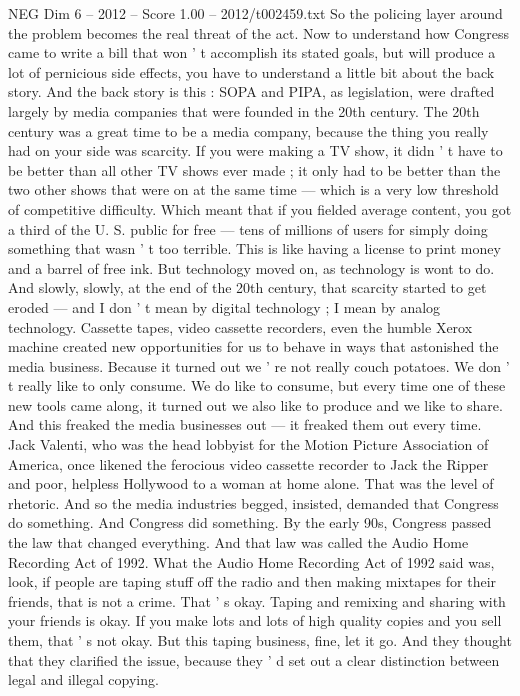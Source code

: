 \begin{textsample}{NEG Dim 6 – 2012 – Score 1.00 – 2012/t002459.txt}
So the policing layer around the problem becomes the real threat of the act.
Now to understand how Congress came to write a bill that won ' t accomplish its stated goals, but will produce a lot of pernicious side effects, you have to understand a little bit about the back story.
And the back story is this : SOPA and PIPA, as legislation, were drafted largely by media companies that were founded in the 20th century.
The 20th century was a great time to be a media company, because the thing you really had on your side was scarcity.
If you were making a TV show, it didn ' t have to be better than all other TV shows ever made ; it only had to be better than the two other shows that were on at the same time — which is a very low threshold of competitive difficulty.
Which meant that if you fielded average content, you got a third of the U.
S. public for free — tens of millions of users for simply doing something that wasn ' t too terrible.
This is like having a license to print money and a barrel of free ink.
But technology moved on, as technology is wont to do.
And slowly, slowly, at the end of the 20th century, that scarcity started to get eroded — and I don ' t mean by digital technology ; I mean by analog technology.
Cassette tapes, video cassette recorders, even the humble Xerox machine created new opportunities for us to behave in ways that astonished the media business.
Because it turned out we ' re not really couch potatoes.
We don ' t really like to only consume.
We do like to consume, but every time one of these new tools came along, it turned out we also like to produce and we like to share.
And this freaked the media businesses out — it freaked them out every time.
Jack Valenti, who was the head lobbyist for the Motion Picture Association of America, once likened the ferocious video cassette recorder to Jack the Ripper and poor, helpless Hollywood to a woman at home alone.
That was the level of rhetoric.
And so the media industries begged, insisted, demanded that Congress do something.
And Congress did something.
By the early 90s, Congress passed the law that changed everything.
And that law was called the Audio Home Recording Act of 1992.
What the Audio Home Recording Act of 1992 said was, look, if people are taping stuff off the radio and then making mixtapes for their friends, that is not a crime.
That ' s okay.
Taping and remixing and sharing with your friends is okay.
If you make lots and lots of high quality copies and you sell them, that ' s not okay.
But this taping business, fine, let it go.
And they thought that they clarified the issue, because they ' d set out a clear distinction between legal and illegal copying.

\end{textsample}
